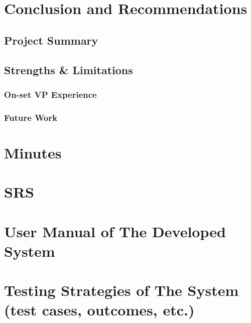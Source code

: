 \documentclass[12pt,a4paper]{report}
\begin{document}
\chapter{Conclusion and Recommendations}

\section{Project Summary}

\section{Strengths \& Limitations}

\subsection{On-set VP Experience}

\subsection{Future Work}


\appendix

\chapter{Minutes}

\chapter{SRS}

\chapter{User Manual of The Developed System}

\chapter{Testing Strategies of The System (test cases, outcomes, etc.)}




\end{document}
